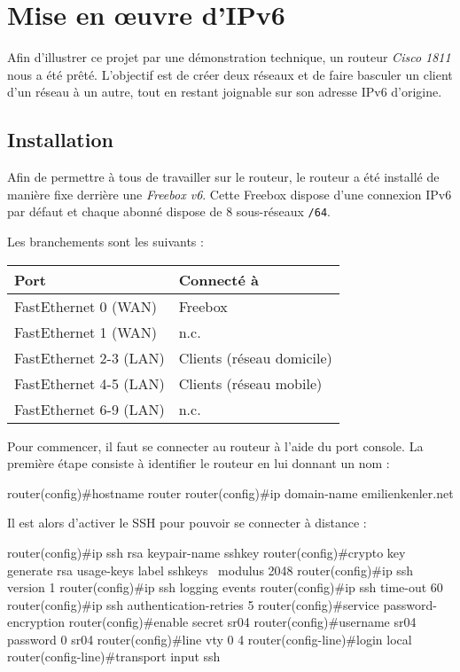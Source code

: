 \section{Mise en œuvre d'IPv6}

Afin d'illustrer ce projet par une démonstration technique, un routeur \emph{Cisco 1811} nous a été prêté. L'objectif est de créer deux réseaux et de faire basculer un client d'un réseau à un autre, tout en restant joignable sur son adresse IPv6 d'origine.

\subsection{Installation}

Afin de permettre à tous de travailler sur le routeur, le routeur a été installé de manière fixe derrière une \emph{Freebox v6}.
Cette Freebox dispose d'une connexion IPv6 par défaut et chaque abonné dispose de 8 sous-réseaux \texttt{/64}.

Les branchements sont les suivants :
\begin{center}
    \begin{tabular}{|l|l|}
    \hline
    Port                   & Connecté à \\ \hline
    FastEthernet 0 (WAN)   & Freebox    \\ \hline
    FastEthernet 1 (WAN)   & n.c.       \\ \hline
    FastEthernet 2-3 (LAN) & Clients (réseau domicile)   \\ \hline
    FastEthernet 4-5 (LAN) & Clients (réseau mobile)   \\ \hline
    FastEthernet 6-9 (LAN) & n.c.   \\ \hline
    \end{tabular}
\end{center}

Pour commencer, il faut se connecter au routeur à l'aide du port console.
La première étape consiste à identifier le routeur en lui donnant un nom :

\begin{code}
router(config)#hostname router
router(config)#ip domain-name emilienkenler.net
\end{code}

Il est alors d'activer le SSH pour pouvoir se connecter à distance :

\begin{code}
router(config)#ip ssh rsa keypair-name sshkey
router(config)#crypto key generate rsa usage-keys label sshkeys \
               modulus 2048
router(config)#ip ssh version 1
router(config)#ip ssh logging events
router(config)#ip ssh time-out 60
router(config)#ip ssh authentication-retries 5
router(config)#service password-encryption
router(config)#enable secret sr04
router(config)#username sr04 password 0 sr04
router(config)#line vty 0 4
router(config-line)#login local
router(config-line)#transport input ssh
\end{code}

